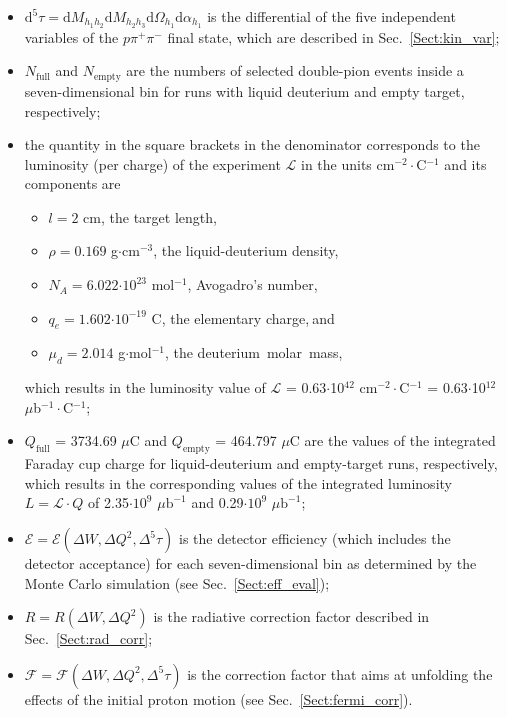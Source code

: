 \documentclass[prc,twocolumn,superscriptaddress,showpacs,amssymb,amsmath,amsfonts,aps,nofootinbib]{revtex4-1}
\begin{document}
\begin{itemize}
\item $\textrm{d}^{5}\tau = \textrm{d}M_{h_{1}h_{2}} \textrm{d}M_{h_{2}h_{3}} \textrm{d}\Omega_{h_1} \textrm{d}\alpha_{h_1}$ is the differential of the five independent variables of the $p\pi^{+}\pi^{-}$ final state, which are described in Sec.\!~\ref{Sect:kin_var};
\item $N_{\text{full}}$ and $N_{\text{empty}}$ are the numbers of selected double-pion events inside a seven-dimensional bin for runs with liquid deuterium and empty target, respectively;
\item the quantity in the square brackets in the denominator corresponds to the luminosity (per charge) of the experiment $\mathcal{L}$ in the units cm$^{-2}\cdot$C$^{-1}$ and its components are
\begin{itemize}
\item[]$\!\!\!\!\!\!\!\!$$l\!=\!2\!$ cm, the target length,\vspace{-0.1em}
\item[]$\!\!\!\!\!\!\!\!$$\rho\!=\!0.169$ g$\cdot$cm$^{-3}$, the liquid-deuterium density,\vspace{-0.1em}
\item[ ]$\!\!\!\!\!\!\!\!$$N_{A}\!=\!6.022$$\cdot 10^{23}$ mol$^{-1}$, Avogadro's number,\vspace{-0.1em}
\item[ ]$\!\!\!\!\!\!\!\!$$q_{e}\!=\!1.602$$\cdot 10^{-19}$ C, the elementary charge,$\:$and\vspace{-0.1em}
\item[ ]$\!\!\!\!\!\!\!\!$$\mu_{d}\!=\!2.014$ g$\cdot$mol$^{-1}$, the deuterium~molar~mass,\vspace{-0.1em}
\end{itemize}
which results in the luminosity value of $\mathcal{L}$ = 0.63$\cdot$10$^{42}$ cm$^{-2}\cdot$C$^{-1}$ = 0.63$\cdot$10$^{12}$ $\mu$b$^{-1}\cdot$C$^{-1}$;


\item $Q_{\text{full}}$ = 3734.69 $\mu$C and $Q_{\text{empty}}$ = 464.797 $\mu$C are the values of the integrated Faraday cup charge for liquid-deuterium and empty-target runs, respectively, which results in the corresponding values of the integrated luminosity $L=\mathcal{L}\cdot Q$ of 2.35$\cdot 10^{9}$ $\mu \text{b}^{-1}$ and 0.29$\cdot 10^{9}$ $\mu \text{b}^{-1}$; 

\item $\mathcal{E} = \mathcal{E}(\Delta W, \Delta Q^{2}, \Delta^{5}\tau)$ is the detector efficiency (which includes the detector acceptance) for each seven-dimensional bin as determined by the Monte Carlo simulation (see Sec.\!~\ref{Sect:eff_eval}); 

\item $R = R(\Delta W, \Delta Q^{2})$ is the radiative correction factor described in Sec.\!~\ref{Sect:rad_corr}; 

\item $\mathcal{F} = \mathcal{F}(\Delta W, \Delta Q^{2}, \Delta^{5}\tau)$ is the correction factor that aims at unfolding the effects of the initial proton motion (see Sec.\!~\ref{Sect:fermi_corr}).

\end{itemize}
\end{document}

